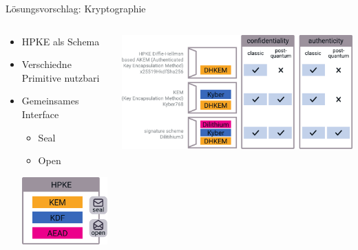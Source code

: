 \begin{frame}[c]{Lösungsvorschlag: Kryptographie}

  \begin{columns}[fullwidth,c]
    \begin{column}{.4\linewidth}
      \begin{itemize}
        \item HPKE als Schema
        \item Verschiedne Primitive nutzbari
        \begin{itemize}

        \end{itemize}
        \item Gemeinsames Interface
        \begin{itemize}
          \item Seal
          \item Open
        \end{itemize}

        \includegraphics[width=0.5\linewidth]{graphics/hpke}
      \end{itemize}
    \end{column}%
    \begin{column}{.6\linewidth}
      \includegraphics[width=\linewidth]{graphics/hpke variants}
    \end{column}
  \end{columns}
\end{frame}

